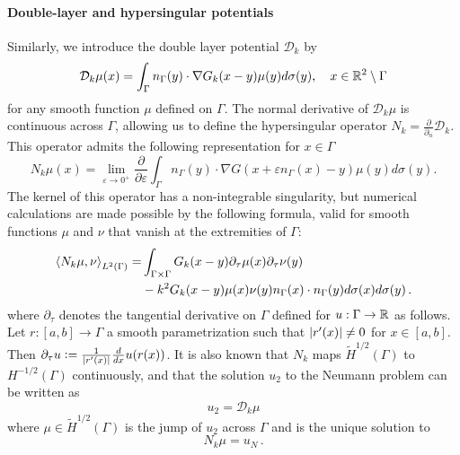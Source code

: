 \documentclass[a4paper]{article}
\begin{document}
\paragraph{Double-layer and hypersingular potentials}
Similarly, we introduce the double layer potential $\mathcal{D}_k$ by 
\[\mathcal{D}_k \mu(x) = \int_{\Gamma} n_\Gamma(y) \cdot \nabla G_k(x-y) \mu(y) d\sigma(y), \quad  x \in \mathbb{R}^2 \setminus \Gamma\]
for any smooth function $\mu$ defined on $\Gamma$.
The normal derivative of $\mathcal{D}_k\mu$ is continuous across $\Gamma$, allowing us to define the hypersingular operator $N_k = \frac{\partial}{\partial_n}\mathcal{D}_k$. This operator admits the following representation for $x\in \Gamma$
\begin{equation}
N_k \mu(x) = \lim_{\varepsilon \to 0^+} \frac{\partial}{\partial \varepsilon}\int_{\Gamma} n_\Gamma(y) \cdot \nabla G(x + \varepsilon n_\Gamma(x) - y) \mu(y) d\sigma(y).
\label{defNk}
\end{equation}
The kernel of this operator has a non-integrable singularity, but numerical calculations are made possible by the following formula, valid for smooth functions $\mu$ and $\nu$ that vanish at the extremities of $\Gamma$: 
\begin{equation}
\label{NkenfonctiondeSk}
	\begin{split}
		\left\langle N_k \mu,\nu\right\rangle_{L^2(\Gamma)} = &\int_{\Gamma\times \Gamma} G_k(x-y) \partial_\tau \mu(x) \partial_\tau \nu(y)\\
		& - k^2 G_k(x-y) \mu(x) \nu(y) n_\Gamma(x) \cdot n_\Gamma(y) d\sigma(x) d\sigma(y)\,.
	\end{split}
\end{equation}
where $\partial_\tau$ denotes the tangential derivative on $\Gamma$ defined for $u :\Gamma \to \mathbb{R}$ as follows. Let $r : [a,b] \to \Gamma$ a smooth parametrization such that $\left\lvert r'(x) \right\rvert \neq 0$ for $x \in [a,b]$. Then $\partial_\tau u \mathrel{\mathop:}= \frac{1}{\left\lvert r'(x) \right\rvert} \frac{d}{dx} u(r(x))$.  
It is also known that $N_k$ maps $\tilde{H}^{1/2}(\Gamma)$ to $H^{-1/2}(\Gamma)$ continuously, and that the solution $u_2$ to the Neumann problem can be written as
\begin{equation}
u_2 = \mathcal{D}_k \mu
\end{equation}
where $\mu \in \tilde{H}^{1/2}(\Gamma)$ is the jump of $u_2$ across $\Gamma$ and is the unique solution to
\begin{equation}
N_k \mu = u_N\,.
\label{Nkmu}
\end{equation}  
\end{document}
